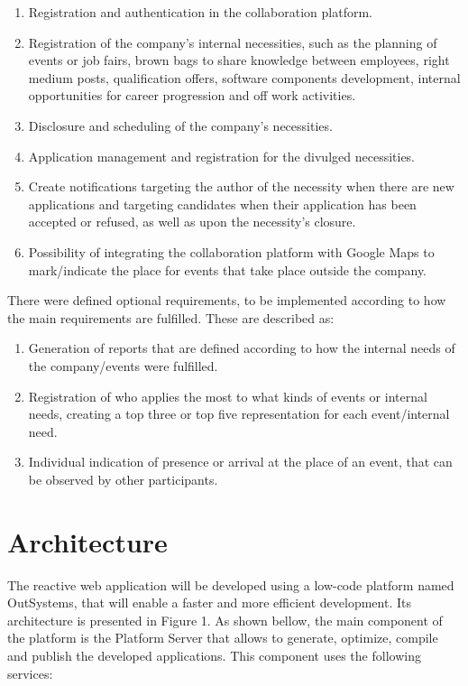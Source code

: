 \documentclass[a4paper,openright,12pt]{report}
\begin{document}
\begin{enumerate}
\item Registration and authentication in the collaboration platform.
\item Registration of the company's internal necessities, such as the planning of events or job fairs, brown bags to share knowledge between employees, right medium posts, qualification offers, software components development, internal opportunities for career progression and off work activities.
\item Disclosure and scheduling of the company's necessities.
\item Application management and registration for the divulged necessities.
\item Create notifications targeting the author of the necessity when there are new applications and targeting candidates when their application has been accepted or refused, as well as upon the necessity's closure.
\item Possibility of integrating the collaboration platform with Google Maps to \\ mark/indicate the place for events that take place outside the company.
\end{enumerate}

There were defined optional requirements, to be implemented according to how the main requirements are fulfilled. These are described as:

\begin{enumerate}
\item Generation of reports that are defined according to how the internal needs of the company/events were fulfilled.
\item Registration of who applies the most to what kinds of events or internal needs, creating a top three or top five representation for each event/internal need. 
\item Individual indication of presence or arrival at the place of an event, that can be observed by other participants.
\end{enumerate}

\section*{Architecture}

The reactive web application will be developed using a low-code platform named OutSystems, 
that will enable a faster and more efficient development. Its architecture is presented in Figure 1. 
As shown bellow, the main component of the platform is the Platform Server that allows to generate, optimize, 
compile and publish the developed applications. This component uses the following services:
\end{document}
